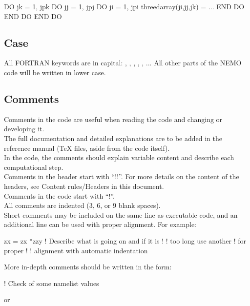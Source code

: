 \documentclass{article}
\begin{document}
\begin{forlines}
DO jk = 1, jpk
   DO jj = 1, jpj
      DO ji = 1, jpi
         threedarray(ji,jj,jk) = ...
      END DO
   END DO
END DO
\end{forlines}

\subsection{Case}

All FORTRAN keywords are in capital: , , , ,
, ... All other parts of the NEMO code will be written in lower case.

\subsection{Comments}

Comments in the code are useful when reading the code and changing or developing it. \\
The full documentation and detailed explanations are to be added in the reference manual
(TeX files, aside from the code itself). \\
In the code, the comments should explain variable content and describe each computational step. \\
Comments in the header start with ``!!''.
For more details on the content of the headers, see Content rules/Headers in this document. \\
Comments in the code start with ``!''. \\
All comments are indented (3, 6, or 9 blank spaces). \\
Short comments may be included on the same line as executable code, and an additional line can be used with
proper alignment.
For example:

\begin{forlines}
zx = zx *zzy   ! Describe what is going on and if it is
!              ! too long use another ! for proper
!              ! alignment with automatic indentation
\end{forlines}

More in-depth comments should be written in the form:

\begin{forlines}
   !  Check of some namelist values
\end{forlines}

or
\end{document}
